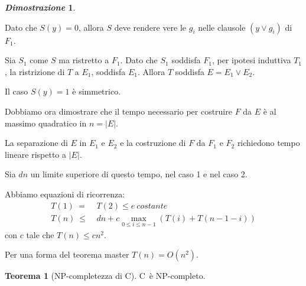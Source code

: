 \documentclass[12pt]{article}
\theoremstyle{definition}
\newtheorem*{mytheo}{Teorema}
\newtheorem*{myproof}{\em Dimostrazione}
\begin{document}
\begin{myproof}
\begin{description}
\begin{enumerate}
\begin{enumerate}
              Dato che \(S(y)=0\), allora \(S\) deve rendere vere le \(g_i\) nelle clausole \((y\lor g_i)\) di \(F_1\).\newline

              Sia \(S_1\) come \(S\) ma ristretto a \(F_1\). Dato che \(S_1\) soddisfa \(F_1\), per ipotesi induttiva \(T_1\),
              la ristrizione di \(T\) a \(E_1\), soddisfa \(E_1\). Allora \(T\) soddisfa \(E = E_1 \lor E_2\).\newline

              Il caso \(S(y)=1\) \`e simmetrico.

          \end{enumerate}

      \end{enumerate}

  \end{description}

  Dobbiamo ora dimostrare che il tempo necessario per costruire \(F\) da \(E\) \`e al massimo quadratico in \(n=|E|\).

  La separazione di \(E\) in \(E_1\) e \(E_2\) e la costruzione di \(F\) da \(F_1\) e \(F_2\) richiedono tempo lineare rispetto a \(|E|\).

  Sia \(dn\) un limite superiore di questo tempo, nel caso 1 e nel caso 2.

  Abbiamo equazioni di ricorrenza:\[
  \begin{aligned}
    T(1)\ =\ &T(2) \leq e\ costante \\
    T(n)\ \leq\ &dn + c \max_{0 \le i \le n-1}(T(i) + T(n-1-i))
  \end{aligned}
  \] con \(c\) tale che \(T(n) \leq cn^2\).

  Per una forma del teorema master \(T(n) = O(n^2)\).

  \hfill \qedsymbol
\end{myproof}

\begin{mytheo}[NP-completezza di C\SAT]
  C\SAT\ \`e NP-completo.
\end{mytheo}
\end{document}
